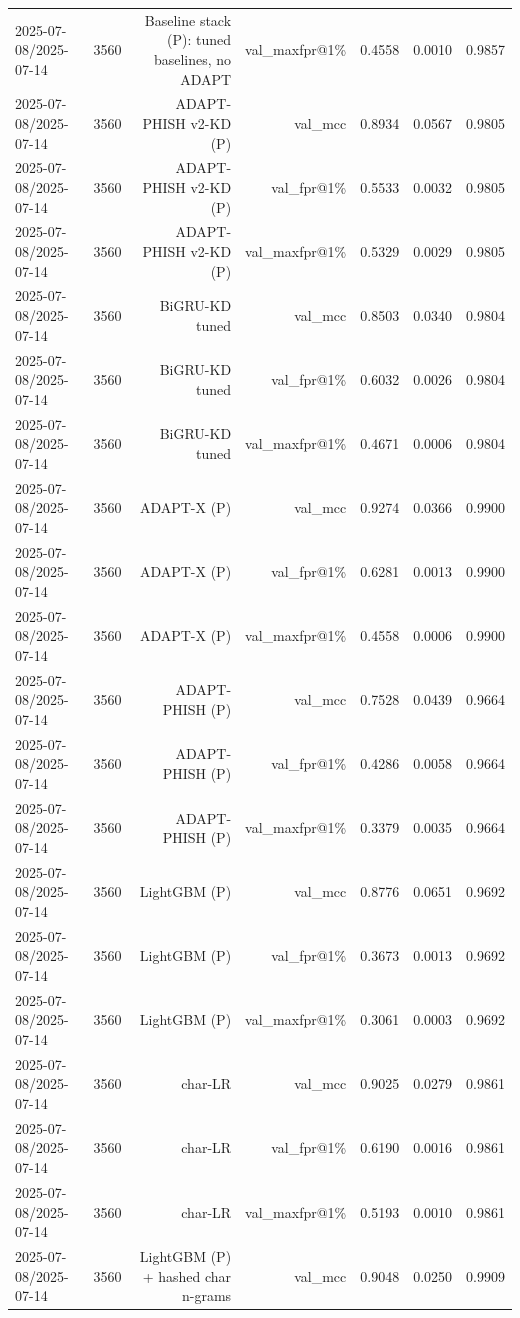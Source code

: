 \begin{table}[t]
\begin{tabular}{llrrrrr}
2025-07-08/2025-07-14 & 3560 & Baseline stack (P): tuned baselines, no ADAPT & val\_maxfpr@1\% & 0.4558 & 0.0010 & 0.9857 \\
2025-07-08/2025-07-14 & 3560 & ADAPT-PHISH v2-KD (P) & val\_mcc & 0.8934 & 0.0567 & 0.9805 \\
2025-07-08/2025-07-14 & 3560 & ADAPT-PHISH v2-KD (P) & val\_fpr@1\% & 0.5533 & 0.0032 & 0.9805 \\
2025-07-08/2025-07-14 & 3560 & ADAPT-PHISH v2-KD (P) & val\_maxfpr@1\% & 0.5329 & 0.0029 & 0.9805 \\
2025-07-08/2025-07-14 & 3560 & BiGRU-KD tuned & val\_mcc & 0.8503 & 0.0340 & 0.9804 \\
2025-07-08/2025-07-14 & 3560 & BiGRU-KD tuned & val\_fpr@1\% & 0.6032 & 0.0026 & 0.9804 \\
2025-07-08/2025-07-14 & 3560 & BiGRU-KD tuned & val\_maxfpr@1\% & 0.4671 & 0.0006 & 0.9804 \\
2025-07-08/2025-07-14 & 3560 & ADAPT-X (P) & val\_mcc & 0.9274 & 0.0366 & 0.9900 \\
2025-07-08/2025-07-14 & 3560 & ADAPT-X (P) & val\_fpr@1\% & 0.6281 & 0.0013 & 0.9900 \\
2025-07-08/2025-07-14 & 3560 & ADAPT-X (P) & val\_maxfpr@1\% & 0.4558 & 0.0006 & 0.9900 \\
2025-07-08/2025-07-14 & 3560 & ADAPT-PHISH (P) & val\_mcc & 0.7528 & 0.0439 & 0.9664 \\
2025-07-08/2025-07-14 & 3560 & ADAPT-PHISH (P) & val\_fpr@1\% & 0.4286 & 0.0058 & 0.9664 \\
2025-07-08/2025-07-14 & 3560 & ADAPT-PHISH (P) & val\_maxfpr@1\% & 0.3379 & 0.0035 & 0.9664 \\
2025-07-08/2025-07-14 & 3560 & LightGBM (P) & val\_mcc & 0.8776 & 0.0651 & 0.9692 \\
2025-07-08/2025-07-14 & 3560 & LightGBM (P) & val\_fpr@1\% & 0.3673 & 0.0013 & 0.9692 \\
2025-07-08/2025-07-14 & 3560 & LightGBM (P) & val\_maxfpr@1\% & 0.3061 & 0.0003 & 0.9692 \\
2025-07-08/2025-07-14 & 3560 & char-LR & val\_mcc & 0.9025 & 0.0279 & 0.9861 \\
2025-07-08/2025-07-14 & 3560 & char-LR & val\_fpr@1\% & 0.6190 & 0.0016 & 0.9861 \\
2025-07-08/2025-07-14 & 3560 & char-LR & val\_maxfpr@1\% & 0.5193 & 0.0010 & 0.9861 \\
2025-07-08/2025-07-14 & 3560 & LightGBM (P) + hashed char n-grams & val\_mcc & 0.9048 & 0.0250 & 0.9909 \\

\end{tabular}
\end{table}
